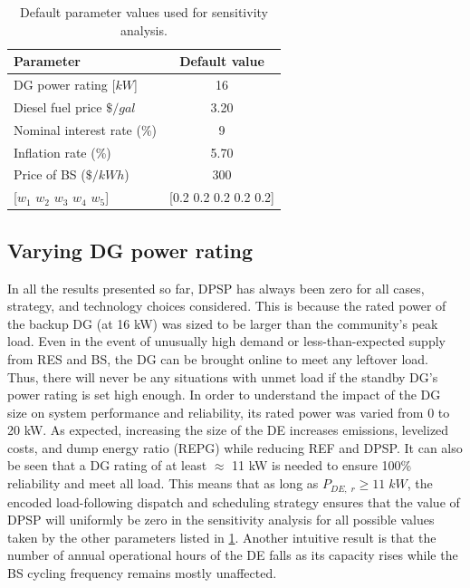 \documentclass[final,3p,times]{elsarticle}
\begin{document}
\begin{table}[htbp]
\centering
\begin{tabular}{@{}lc@{}}
\toprule
\textbf{Parameter}                 & \textbf{Default value}                        \\ \midrule
DG power rating [$kW$]         & 16                                            \\
Diesel fuel price {$\$/gal$} & 3.20                                          \\
Nominal interest rate (\%)         & 9                                             \\
Inflation rate (\%)                & 5.70                                           \\
Price of BS ($\$/kWh$)               & 300  \\
{[}$w_1$ $w_2$ $w_3$ $w_4$ $w_5${]}  &  [0.2 0.2 0.2 0.2 0.2] \\ 
\bottomrule
\end{tabular}
\caption{\label{tab:default} Default parameter values used for sensitivity analysis.}
\end{table}

\subsection{Varying DG power rating}

In all the results presented so far, DPSP has always been zero for all cases, strategy, and technology choices considered. This is because the rated power of the backup DG (at 16 kW) was sized to be larger than the community's peak load. Even in the event of unusually high demand or less-than-expected supply from RES and BS, the DG can be brought online to meet any leftover load. Thus, there will never be any situations with unmet load if the standby DG's power rating is set high enough. In order to understand the impact of the DG size on system performance and reliability, its rated power was varied from 0 to 20 kW. As expected, increasing the size of the DE increases emissions, levelized costs, and dump energy ratio (REPG) while reducing REF and DPSP. It can also be seen that a DG rating of at least $\approx$ 11 kW is needed to ensure 100\% reliability and meet all load. This means that as long as $P_{DE,\;r} \geq 11 \; kW$, the encoded load-following dispatch and scheduling strategy ensures that the value of DPSP will uniformly be zero in the sensitivity analysis for all possible values taken by the other parameters listed in \cref{tab:default}. Another intuitive result is that the number of annual operational hours of the DE falls as its capacity rises while the BS cycling frequency remains mostly unaffected.
\end{document}
